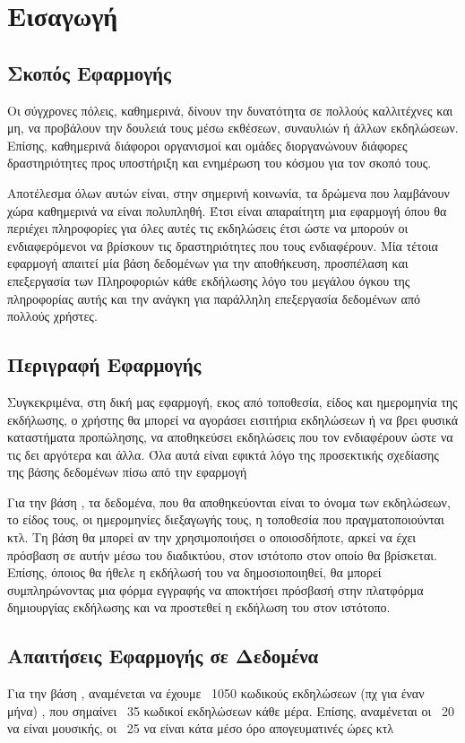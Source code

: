 ﻿\section{Εισαγωγή}

\subsection{Σκοπός Εφαρμογής}

Οι σύγχρονες πόλεις, καθημερινά, δίνουν την δυνατότητα σε πολλούς
καλλιτέχνες και μη, να προβάλουν την δουλειά τους μέσω εκθέσεων,
συναυλιών ή άλλων εκδηλώσεων. Επίσης, καθημερινά διάφοροι οργανισμοί
και ομάδες διοργανώνουν διάφορες δραστηριότητες προς υποστήριξη και
ενημέρωση του κόσμου για τον σκοπό τους.

Αποτέλεσμα όλων αυτών είναι, στην σημερινή κοινωνία, τα δρώμενα που
λαμβάνουν χώρα καθημερινά να είναι πολυπληθή. Έτσι είναι απαραίτητη
μια εφαρμογή όπου θα περιέχει πληροφορίες για όλες αυτές τις
εκδηλώσεις έτσι ώστε να μπορούν οι ενδιαφερόμενοι να βρίσκουν τις
δραστηριότητες που τους ενδιαφέρουν. Μία τέτοια εφαρμογή απαιτεί μία
βάση δεδομένων για την αποθήκευση, προσπέλαση και επεξεργασία των
Πληροφοριών κάθε εκδήλωσης λόγο του μεγάλου όγκου της πληροφορίας
αυτής και την ανάγκη για παράλληλη επεξεργασία δεδομένων από πολλούς
χρήστες.

\subsection{Περιγραφή Εφαρμογής}

Συγκεκριμένα, στη δική μας εφαρμογή, εκος από τοποθεσία, είδος και
ημερομηνία της εκδήλωσης, ο χρήστης θα μπορεί να αγοράσει εισιτήρια
εκδηλώσεων ή να βρει φυσικά καταστήματα προπώλησης, να αποθηκεύσει
εκδηλώσεις που τον ενδιαφέρουν ώστε να τις δει αργότερα και άλλα. Όλα
αυτά είναι εφικτά λόγο της προσεκτικής σχεδίασης της βάσης δεδομένων
πίσω από την εφαρμογή

Για την βάση \titlos, τα δεδομένα, που θα αποθηκεύονται είναι το όνομα
των εκδηλώσεων, το είδος τους, οι ημερομηνίες διεξαγωγής τους, η
τοποθεσία που πραγματοποιούνται κτλ. Τη βάση θα μπορεί αν την
χρησιμοποιήσει ο οποιοσδήποτε, αρκεί να έχει πρόσβαση σε αυτήν μέσω
του διαδικτύου, στον ιστότοπο στον οποίο θα βρίσκεται. Επίσης, όποιος
θα ήθελε η εκδήλωσή του να δημοσιοποιηθεί, θα μπορεί συμπληρώνοντας
μια φόρμα εγγραφής να αποκτήσει πρόσβασή στην πλατφόρμα δημιουργίας
εκδήλωσης και να προστεθεί η εκδήλωση του στον ιστότοπο.

\subsection{Απαιτήσεις Εφαρμογής σε Δεδομένα}

Για την βάση \titlos, αναμένεται να έχουμε ~1050 κωδικούς εκδηλώσεων
(πχ για έναν μήνα) , που σημαίνει ~35 κωδικοί εκδηλώσεων κάθε
μέρα. Επίσης, αναμένεται οι ~20 να είναι μουσικής, οι ~25 να είναι
κάτα μέσο όρο απογευματινές ώρες κτλ



